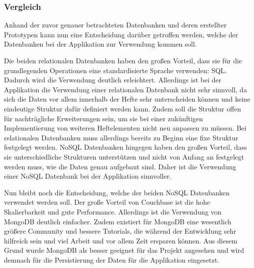 \subsubsection{Vergleich}
Anhand der zuvor genauer betrachteten Datenbanken und deren erstellter Prototypen kann nun eine Entscheidung darüber getroffen werden, welche der Datenbanken bei der Applikation zur Verwendung kommen soll.

Die beiden relationalen Datenbanken haben den großen Vorteil, dass sie für die grundlegenden Operationen eine standardisierte Sprache verwenden: SQL. Dadurch wird die Verwendung deutlich erleichtert. Allerdings ist bei der Applikation die Verwendung einer relationalen Datenbank nicht sehr sinnvoll, da sich die Daten vor allem innerhalb der Hefte sehr unterscheiden können und keine eindeutige Struktur dafür definiert werden kann. Zudem soll die Struktur offen für nachträgliche Erweiterungen sein, um sie bei einer zukünftigen Implementierung von weiteren Heftelementen nicht neu anpassen zu müssen. Bei relationalen Datenbanken muss allerdings bereits zu Beginn eine fixe Struktur festgelegt werden. NoSQL Datenbanken hingegen haben den großen Vorteil, dass sie unterschiedliche Strukturen unterstützen und nicht von Anfang an festgelegt werden muss, wie die Daten genau aufgebaut sind. Daher ist die Verwendung einer NoSQL Datenbank bei der Applikation sinnvoller.

Nun bleibt noch die Entscheidung, welche der beiden NoSQL Datenbanken verwendet werden soll. Der große Vorteil von Couchbase ist die hohe Skalierbarkeit und gute Performance. Allerdings ist die Verwendung von MongoDB deutlich einfacher. Zudem existiert für MongoDB eine wesentlich größere Community und bessere Tutorials, die während der Entwicklung sehr hilfreich sein und viel Arbeit und vor allem Zeit ersparen können. Aus diesem Grund wurde MongoDB als besser geeignet für das Projekt angesehen und wird demnach für die Persistierung der Daten für die Applikation eingesetzt.